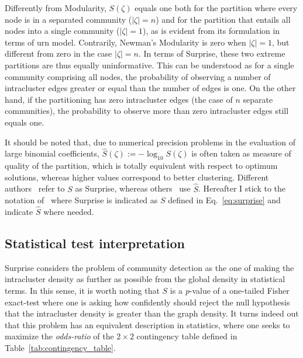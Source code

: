 Differently from Modularity, $S(\zeta)$ equals one both for the partition where every node is in a separated community ($|\zeta|=n$) and for the partition that entails all nodes into a single community ($|\zeta|=1$), as is evident from its formulation in terms of urn model.
Contrarily, Newman's Modularity is zero when $|\zeta|=1$, but different from zero in the case $|\zeta|=n$.
In terms of Surprise, these two extreme partitions are thus equally uninformative.
This can be understood as for a single community comprising all nodes, the probability of observing a number of intracluster edges greater or equal than the number of edges is one. On the other hand, if the partitioning has zero intracluster edges (the case of $n$ separate communities), the probability to observe more than zero intracluster edges still equals one.

It should be noted that, due to numerical precision problems in the evaluation of large binomial coefficients, $\hat{S}(\zeta) := -\log_{10}S(\zeta)$ is often taken as measure of quality of the partition, which is totally equivalent with respect to optimum solutions, whereas higher values correspond to better clustering.
Different authors~\cite{arnauVMarsS2005,fleck2014} refer to $S$ as Surprise, whereas others~\cite{aldecoa2011,aldecoa2013} use $\hat{S}$.
Hereafter I stick to the notation of~\cite{fleck2014} where Surprise is indicated as $S$ defined in Eq.~\ref{eq:surprise} and indicate $\hat{S}$ where needed.

\subsection{Statistical test interpretation}
\label{sec:surprisefishertest}
Surprise considers the problem of community detection as the one of making the intracluster density as further as possible from the global density in statistical terms.
In this sense, it is worth noting that $S$ is a \emph{p}-value of a one-tailed Fisher exact-test where one is asking how confidently should reject the null hypothesis that the intracluster density is greater than the graph density.
It turns indeed out that this problem has an equivalent description in statistics, where one seeks to maximize the \emph{odds-ratio} of the $2 \times 2$ contingency table defined in Table~\ref{tab:contingency_table}.


